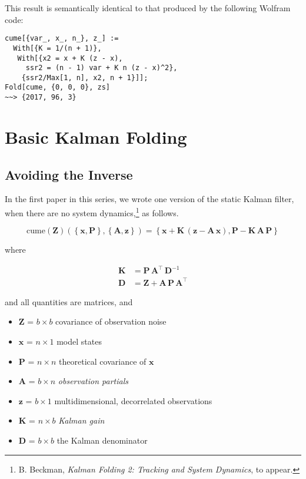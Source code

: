 \documentclass[10pt,oneside,x11names]{article}
\begin{document}
This result is semantically identical to that produced by the following Wolfram
code:

\begin{verbatim}
cume[{var_, x_, n_}, z_] :=
  With[{K = 1/(n + 1)},
   With[{x2 = x + K (z - x),
     ssr2 = (n - 1) var + K n (z - x)^2},
    {ssr2/Max[1, n], x2, n + 1}]];
Fold[cume, {0, 0, 0}, zs]
~~> {2017, 96, 3}
\end{verbatim}

\section{Basic Kalman Folding}
\label{sec:orgheadline21}

\subsection{Avoiding the Inverse}
\label{sec:orgheadline16}

In the first paper in this series, we wrote one version of the static Kalman
filter, when there are no system dynamics,\footnote{B. Beckman, \emph{Kalman Folding 2: Tracking and System Dynamics}, to appear.} as follows.

\begin{equation}
\label{eqn:kalman-cume-definition}
\text{cume}
\left(
\mathbold{Z}
\right)
\left(
\left\{
\mathbold{x},
\mathbold{P}
\right\},
\left\{
\mathbold{A},
\mathbold{z}
\right\}
\right) =
\left\{
\mathbold{x}+
\mathbold{K}\,
\left(
\mathbold{z}-
\mathbold{A}\,
\mathbold{x}
\right),
\mathbold{P}-
\mathbold{K}\,
\mathbold{A}\,
\mathbold{P}
\right\}
\end{equation}

\noindent where

\begin{align}
\label{eqn:kalman-gain-definition}
\mathbold{K}
&=
\mathbold{P}\,
\mathbold{A}^\intercal\,
\mathbold{D}^{-1} \\
\label{eqn:kalman-denominator-definition}
\mathbold{D}
&= \mathbold{Z} +
\mathbold{A}\,
\mathbold{P}\,
\mathbold{A}^\intercal
\end{align}

\noindent and all quantities are matrices, and

\begin{itemize}
\item \(\mathbold{Z}\) =   \({b}\times{b}\) covariance of observation noise
\item \(\mathbold{x}\) =   \({n}\times{1}\) model states
\item \(\mathbold{P}\) =   \({n}\times{n}\) theoretical covariance of \(\mathbold{x}\)
\item \(\mathbold{A}\) =   \({b}\times{n}\) \emph{observation partials}
\item \(\mathbold{z}\) =   \({b}\times{1}\) multidimensional, decorrelated observations
\item \(\mathbold{K}\) =   \({n}\times{b}\) \emph{Kalman gain}
\item \(\mathbold{D}\) =   \({b}\times{b}\) the Kalman denominator
\end{itemize}
\end{document}
